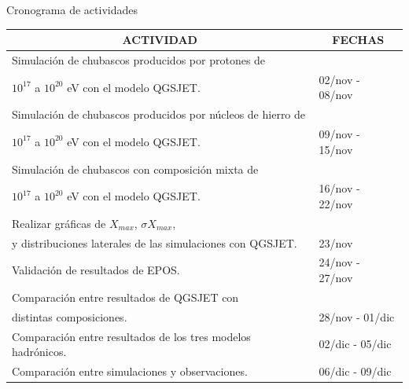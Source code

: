 \documentclass[10pt]{beamer}
\begin{document}
\begin{frame}{Cronograma de actividades}

\begin{footnotesize}
\begin{table}
\bgroup
\def\arraystretch{1.5}
\begin{tabular}{|l|l|}
\hline
\multicolumn{1}{|c|}{\textbf{ACTIVIDAD}}                                            							& \multicolumn{1}{c|}{\textbf{FECHAS}} \\ \hline
Simulación de chubascos producidos por protones de\\ $10^{17}$ a $10^{20}$ eV con el modelo QGSJET. 				& 02/nov - 08/nov             \\ \hline
Simulación de chubascos producidos por núcleos de hierro de\\ $10^{17}$ a $10^{20}$ eV con el modelo QGSJET. 	& 09/nov - 15/nov             \\ \hline
Simulación de chubascos con composición mixta de \\$10^{17}$ a $10^{20}$ eV con el modelo QGSJET.  				& 16/nov - 22/nov             \\ \hline
Realizar gráficas de $X_{max}$, $\sigma X_{max}$, \\y distribuciones laterales de las simulaciones con QGSJET.	& 23/nov 		              \\ \hline
Validación de resultados de EPOS.              																& 24/nov - 27/nov             \\ \hline
Comparación entre resultados de QGSJET con \\distintas composiciones.              								& 28/nov - 01/dic             \\ \hline
Comparación entre resultados de los tres modelos hadrónicos.     												& 02/dic - 05/dic             \\ \hline
Comparación entre simulaciones y observaciones.																& 06/dic - 09/dic             \\ \hline
\end{tabular}
\egroup
\end{table}
\end{footnotesize}
\end{frame}
\end{document}
